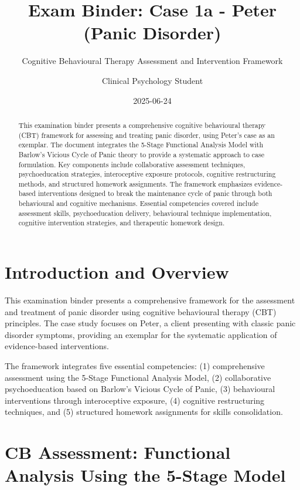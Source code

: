 \documentclass[
  american,
  11pt,
  11pt,
  letterpaper,
  onecolumn]{article}
\title{Exam Binder: Case 1a - Peter (Panic Disorder)}
\subtitle{Cognitive Behavioural Therapy Assessment and Intervention
Framework}
\author{Clinical Psychology Student}
\date{2025-06-24}
\begin{document}
\maketitle
\begin{abstract}
This examination binder presents a comprehensive cognitive behavioural
therapy (CBT) framework for assessing and treating panic disorder, using
Peter's case as an exemplar. The document integrates the 5-Stage
Functional Analysis Model with Barlow's Vicious Cycle of Panic theory to
provide a systematic approach to case formulation. Key components
include collaborative assessment techniques, psychoeducation strategies,
interoceptive exposure protocols, cognitive restructuring methods, and
structured homework assignments. The framework emphasizes evidence-based
interventions designed to break the maintenance cycle of panic through
both behavioural and cognitive mechanisms. Essential competencies
covered include assessment skills, psychoeducation delivery, behavioural
technique implementation, cognitive intervention strategies, and
therapeutic homework design.
\end{abstract}


\section{Introduction and Overview}\label{introduction-and-overview}

This examination binder presents a comprehensive framework for the
assessment and treatment of panic disorder using cognitive behavioural
therapy (CBT) principles. The case study focuses on Peter, a client
presenting with classic panic disorder symptoms, providing an exemplar
for the systematic application of evidence-based interventions.

The framework integrates five essential competencies: (1) comprehensive
assessment using the 5-Stage Functional Analysis Model, (2)
collaborative psychoeducation based on Barlow's Vicious Cycle of Panic,
(3) behavioural interventions through interoceptive exposure, (4)
cognitive restructuring techniques, and (5) structured homework
assignments for skills consolidation.

\section{CB Assessment: Functional Analysis Using the 5-Stage
Model}\label{cb-assessment-functional-analysis-using-the-5-stage-model}
\end{document}
